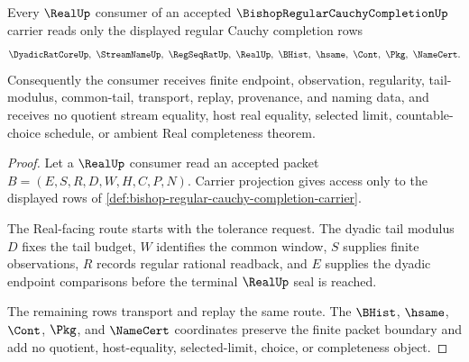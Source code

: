 \begin{theorem}
\label{thm:bishop-regular-cauchy-completion-seal-stability}
Every $\RealUp$ consumer of an accepted $\BishopRegularCauchyCompletionUp$ carrier reads only the displayed regular Cauchy completion rows
$$
\DyadicRatCoreUp,\ \StreamNameUp,\ \RegSeqRatUp,\ \RealUp,\ \BHist,\ \hsame,\ \Cont,\ \Pkg,\ \NameCert .
$$
Consequently the consumer receives finite endpoint, observation, regularity, tail-modulus, common-tail, transport, replay, provenance, and naming data, and receives no quotient stream equality, host real equality, selected limit, countable-choice schedule, or ambient Real completeness theorem.
\end{theorem}
\begin{proof}
Let a $\RealUp$ consumer read an accepted packet $B=(E,S,R,D,W,H,C,P,N)$. Carrier projection gives access only to the displayed rows of \autoref{def:bishop-regular-cauchy-completion-carrier}.

The Real-facing route starts with the tolerance request. The dyadic tail modulus $D$ fixes the tail budget, $W$ identifies the common window, $S$ supplies finite observations, $R$ records regular rational readback, and $E$ supplies the dyadic endpoint comparisons before the terminal $\RealUp$ seal is reached.

The remaining rows transport and replay the same route. The $\BHist$, $\hsame$, $\Cont$, $\Pkg$, and $\NameCert$ coordinates preserve the finite packet boundary and add no quotient, host-equality, selected-limit, choice, or completeness object.
\end{proof}


